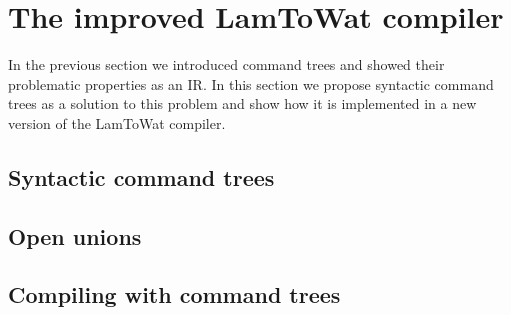 
\chapter{\label{chap:bettercompiler}The improved LamToWat compiler}

In the previous section we introduced command trees and showed their problematic properties as an \ac{IR}. In this section we propose syntactic command trees as a solution to this problem and show how it is implemented in a new version of the LamToWat compiler.

\section{\label{section:syncomtree}Syntactic command trees}
\section{\label{section:openunion}Open unions}
\section{\label{section:compcomtree}Compiling with command trees}
